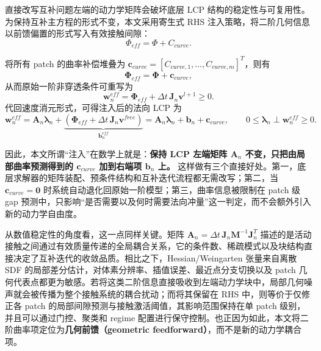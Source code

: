 直接改写互补问题左端的动力学矩阵会破坏底层 LCP 结构的稳定性与可复用性。为保持互补主方程的形式不变，本文采用寄生式 RHS 注入策略，将二阶几何信息以前馈偏置的形式写入有效接触间隙：
\begin{equation}
    \Phi_{eff} = \Phi + C_{curve}.
\end{equation}

将所有 patch 的曲率补偿堆叠为 $\mathbf{c}_{curve}=[C_{curve,1},\ldots,C_{curve,m}]^T$，则有
\begin{equation}
    \boldsymbol{\Phi}_{eff} = \boldsymbol{\Phi} + \mathbf{c}_{curve},
\end{equation}
从而原始一阶非穿透条件可重写为
\begin{equation}
    \mathbf{w}_n^{eff} = \boldsymbol{\Phi}_{eff} + \Delta t\,\mathbf{J}_n \mathbf{v}^{l+1} \ge 0.
\end{equation}
代回速度消元形式，可得注入后的法向 LCP 为
\begin{equation}
    \mathbf{w}_n^{eff}
    =
    \mathbf{A}_n \boldsymbol{\lambda}_n
    +
    \underbrace{\left(\boldsymbol{\Phi}_{eff} + \Delta t\,\mathbf{J}_n \mathbf{v}^{free}\right)}_{\mathbf{b}_n^{eff}}
    =
    \mathbf{A}_n \boldsymbol{\lambda}_n + \mathbf{b}_n + \mathbf{c}_{curve},
    \qquad
    0 \le \boldsymbol{\lambda}_n \perp \mathbf{w}_n^{eff} \ge 0.
\end{equation}

因此，本文所谓“注入”在数学上就是：\textbf{保持 LCP 左端矩阵 $\mathbf{A}_n$ 不变，只把由局部曲率预测得到的 $\mathbf{c}_{curve}$ 加到右端项 $\mathbf{b}_n$ 上。} 这样做有三个直接好处。第一，底层求解器的矩阵装配、预条件结构和互补迭代流程都无需改写；第二，当 $\mathbf{c}_{curve}=\mathbf{0}$ 时系统自动退化回原始一阶模型；第三，曲率信息被限制在 patch 级 gap 预测中，只影响“是否需要以及何时需要法向冲量”这一判定，而不会额外引入新的动力学自由度。

从数值稳定性的角度看，这一点同样关键。矩阵 $\mathbf{A}_n=\Delta t\,\mathbf{J}_n\mathbf{M}^{-1}\mathbf{J}_n^T$ 描述的是活动接触之间通过有效质量传递的全局耦合关系，它的条件数、稀疏模式以及块结构直接决定了互补迭代的收敛品质。相比之下，Hessian/Weingarten 张量来自离散 SDF 的局部差分估计，对体素分辨率、插值误差、最近点分支切换以及 patch 几何代表点都更为敏感。若将这类二阶信息直接吸收到左端动力学块中，局部几何噪声就会被传播为整个接触系统的耦合扰动；而将其保留在 RHS 中，则等价于仅修正各 patch 的局部间隙预测与接触激活阈值，其影响范围保持在单 patch 级别，并且可以通过门控、聚类和 regime 配置进行保守控制。也正因为如此，本文将二阶曲率项定位为\textbf{几何前馈（geometric feedforward）}，而不是新的动力学耦合项。

